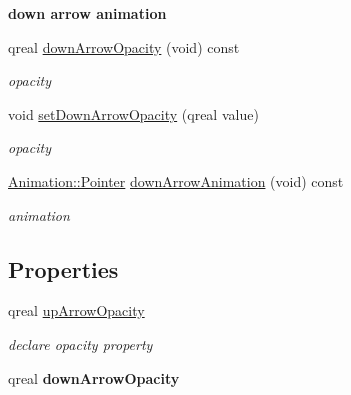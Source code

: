 \begin{Indent}\textbf{ down arrow animation}\par
\begin{DoxyCompactItemize}
\item 
\mbox{\label{class_spin_box_data_ae981e6c2b1f79acf964a7e07ad1bcc23}} 
qreal \hyperlink{class_spin_box_data_ae981e6c2b1f79acf964a7e07ad1bcc23}{down\+Arrow\+Opacity} (void) const
\begin{DoxyCompactList}\small\item\em opacity \end{DoxyCompactList}\item 
\mbox{\label{class_spin_box_data_a0a265caac64bdc4fbef490535cbe5fca}} 
void \hyperlink{class_spin_box_data_a0a265caac64bdc4fbef490535cbe5fca}{set\+Down\+Arrow\+Opacity} (qreal value)
\begin{DoxyCompactList}\small\item\em opacity \end{DoxyCompactList}\item 
\mbox{\label{class_spin_box_data_a3c04b87cedccf8687958511bf2174b35}} 
\hyperlink{class_animation_ac48a8d074abd43dc3f6485353ba24e30}{Animation\+::\+Pointer} \hyperlink{class_spin_box_data_a3c04b87cedccf8687958511bf2174b35}{down\+Arrow\+Animation} (void) const
\begin{DoxyCompactList}\small\item\em animation \end{DoxyCompactList}\end{DoxyCompactItemize}
\end{Indent}
\subsection*{Properties}
\begin{DoxyCompactItemize}
\item 
\mbox{\label{class_spin_box_data_a8b69eab071aa324d8bfedc7f6b476d41}} 
qreal \hyperlink{class_spin_box_data_a8b69eab071aa324d8bfedc7f6b476d41}{up\+Arrow\+Opacity}
\begin{DoxyCompactList}\small\item\em declare opacity property \end{DoxyCompactList}\item 
\mbox{\label{class_spin_box_data_a2871eca0e33de3ddbfa5517f7ed051b9}} 
qreal {\bfseries down\+Arrow\+Opacity}
\end{DoxyCompactItemize}
